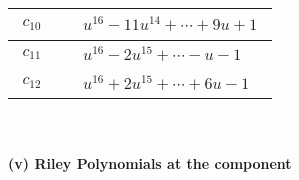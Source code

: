 \documentclass[1p]{elsarticle_modified}
\theoremstyle{definition}
\begin{document}
\begin{tabular}{m{50pt}|m{274pt}}
\hline $$\begin{aligned}c_{10}\end{aligned}$$&$\begin{aligned}
&u^{16}-11 u^{14}+\cdots+9 u+1
\end{aligned}$\\
\hline $$\begin{aligned}c_{11}\end{aligned}$$&$\begin{aligned}
&u^{16}-2 u^{15}+\cdots- u-1
\end{aligned}$\\
\hline $$\begin{aligned}c_{12}\end{aligned}$$&$\begin{aligned}
&u^{16}+2 u^{15}+\cdots+6 u-1
\end{aligned}$\\
\hline
\end{tabular}\\~\\
\newpage\renewcommand{\arraystretch}{1}
\flushleft \textbf{(v) Riley Polynomials at the component}\newline \\
\end{document}
